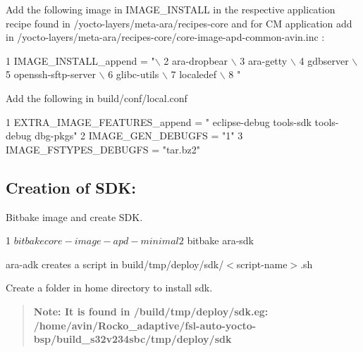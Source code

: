 \begin{DoxyItemize}
\item Add the following image in I\+M\+A\+G\+E\+\_\+\+I\+N\+S\+T\+A\+LL in the respective application recipe found in /yocto-\/layers/meta-\/ara/recipes-\/core and for CM application add in /yocto-\/layers/meta-\/ara/recipes-\/core/core-\/image-\/apd-\/common-\/avin.inc \+: 
\begin{DoxyCode}
1 IMAGE\_INSTALL\_append = "\(\backslash\)
2         ara-dropbear \(\backslash\)
3         ara-getty \(\backslash\)
4         gdbserver \(\backslash\)
5         openssh-sftp-server \(\backslash\)
6         glibc-utils \(\backslash\)
7         localedef \(\backslash\)
8         "
\end{DoxyCode}

\item Add the following in build/conf/local.\+conf 
\begin{DoxyCode}
1 EXTRA\_IMAGE\_FEATURES\_append =  " eclipse-debug tools-sdk tools-debug dbg-pkgs"
2 IMAGE\_GEN\_DEBUGFS = "1"
3 IMAGE\_FSTYPES\_DEBUGFS = "tar.bz2"
\end{DoxyCode}

\end{DoxyItemize}

\subsection*{Creation of S\+DK\+:}


\begin{DoxyItemize}
\item Bitbake image and create S\+DK. 
\begin{DoxyCode}
1 $ bitbake core-image-apd-minimal
2 $ bitbake ara-sdk
\end{DoxyCode}

\item ara-\/adk creates a script in build/tmp/deploy/sdk/$<$script-\/name$>$.sh
\item Create a folder in home directory to install sdk. 

\end{DoxyItemize}

\begin{quote}
{\bfseries Note\+: It is found in /build/tmp/deploy/sdk.eg\+: /home/avin/\+Rocko\+\_\+adaptive/fsl-\/auto-\/yocto-\/bsp/build\+\_\+s32v234sbc/tmp/deploy/sdk} \end{quote}


